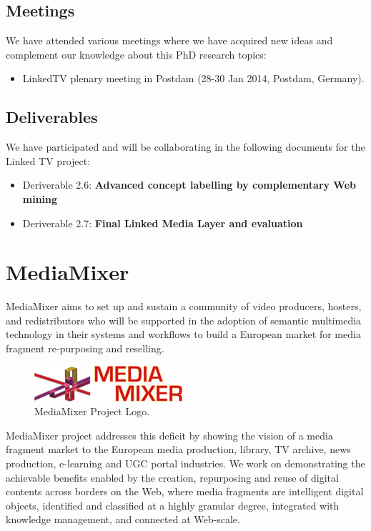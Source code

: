 \documentclass[a4paper,11pt]{report}
\begin{document}
\subsection*{Meetings}

We have attended various meetings where we have acquired new ideas and complement our knowledge about this PhD research topics:

\begin{itemize}
\item  LinkedTV plenary meeting in Postdam (28-30 Jan 2014, Postdam, Germany).
\end{itemize}

\subsection*{Deliverables}

We have participated and will be collaborating in the following documents for the Linked TV project:

\begin{itemize}
\item   Deriverable 2.6: \textbf{Advanced concept labelling by complementary Web mining}
\item   Deriverable 2.7: \textbf{Final Linked Media Layer and evaluation}
\end{itemize}


\section*{MediaMixer}

MediaMixer aims to set up and sustain a community of video producers, hosters, and redistributors who will be supported in the adoption of semantic multimedia technology in their systems and workflows to build a European market for media fragment re-purposing and reselling.


\begin{figure} [h]
\centering
\includegraphics [scale=0.50] {figure/mediamixer_logo.jpg}
\caption{MediaMixer Project Logo.}
\label{fig:linkedtv_logo}
\end{figure} 


MediaMixer project addresses this deficit by showing the vision of a media fragment market to the European media production, library, TV archive, news production, e-learning and UGC portal industries. We work on 
demonstrating the achievable benefits enabled by the creation, repurposing and reuse of digital contents across borders on the Web, where media fragments are intelligent digital objects, identified and classified at a highly granular degree, integrated with knowledge management, and connected at Web-scale.
\end{document}
